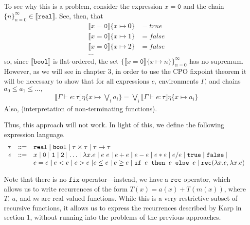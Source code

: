 To see why this is a problem, consider the expression $x = \texttt{0}$ and the chain $\{n\}_{n=0}^{\infty} \in \llbracket 
\texttt{real} \rrbracket$. See, then, that
\begin{align*}
\llbracket x = \texttt{0} \rrbracket\{x \mapsto 0\} &= true \\
\llbracket x = \texttt{0} \rrbracket\{x \mapsto 1\} &= false \\
\llbracket x = \texttt{0} \rrbracket\{x \mapsto 2\} &= false \\
\ldots
\end{align*}
so, since $\llbracket \texttt{bool} \rrbracket$ is flat-ordered, the set 
$\{\llbracket x = \texttt{0}\rrbracket\{x \mapsto n\}\}_{n=0}^{\infty}$ has no supremum. However, as we will see in chapter 3,
in order to use the CPO fixpoint theorem it will be necessary to show that for all expressions $e$, environments $\Gamma$,
and chains $a_0 \leq a_1 \leq \ldots,$
\begin{align*}
  \llbracket \Gamma \vdash e : \tau \rrbracket\eta\{x\mapsto \bigvee_i a_i\}
  = \bigvee_i \llbracket \Gamma \vdash e : \tau \rrbracket\eta\{x \mapsto a_i\}
\end{align*}
Also, (interpretation of non-terminating functions).

Thus, this approach will not work. In light of this, we define the following expression language. 
\[
\begin{array}{rcl}
\tau &::=& \texttt{real} \mid \texttt{bool} \mid \tau \times \tau \mid \tau \rightarrow \tau \\
e &::=& x  \mid \texttt{0} \mid \texttt{1} \mid \texttt{2} \mid \dotsc \mid \lambda x.e \mid e \ e \mid e + e \mid e - e \mid  e  *  e \mid e / e \mid \texttt{true} \mid \texttt{false} \mid \\
  && e  =  e \mid e < e \mid e > e \ | e \leq e \mid e \geq e \mid 
     \texttt{if } e \texttt{ then } e \texttt{ else } e \mid \texttt{rec}(\lambda x.e, \lambda x.e) 
\end{array}
\]

Note that there is no $\texttt{fix}$ operator---instead, we have a $\texttt{rec}$ operator, which allows us to write 
recurrences of the form $T(x) = a(x) + T(m(x))$, where $T$, $a$, and $m$ are real-valued functions. While this is a very 
restrictive subset of recursive functions, it allows us to express the recurrences described by Karp in section 1, without
running into the problems of the previous approaches. 

